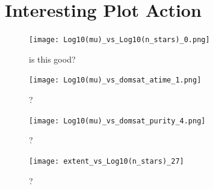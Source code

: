 \documentclass[11pt,a4paper,fleqn,notitlepage,oneside]{article}
\begin{document}
\section{Interesting Plot Action} %
	\label{sec:interesting_plot_action}

	\begin{figure}[H]
		\texttt{[image: Log10(mu)\_vs\_Log10(n\_stars)\_0.png]}
		\caption{
			is this good? 
		}
		\label{fig:Log10(mu)_vs_domsat_purity_5}
		\end{figure}

	\begin{figure}[H]
		\texttt{[image: Log10(mu)\_vs\_domsat\_atime\_1.png]}
		\caption{
			? 
		}
		\label{fig:Log10(mu)_vs_domsat_purity_5}
	\end{figure}

	\begin{figure}[H]
		\texttt{[image: Log10(mu)\_vs\_domsat\_purity\_4.png]}
		\caption{
			? 
		}
		\label{fig:Log10(mu)_vs_domsat_purity_5t}
	\end{figure}

	\begin{figure}[H]
		\texttt{[image: extent\_vs\_Log10(n\_stars)\_27]}
		\caption{
			? 
		}
		\label{fig:extent_vs_Log10(n_stars)_27}
	\end{figure}
\end{document}
